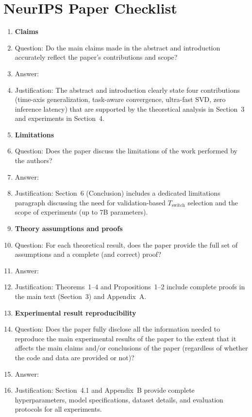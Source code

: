 \section*{NeurIPS Paper Checklist}

\begin{enumerate}

\item {\bf Claims}
    \item[] Question: Do the main claims made in the abstract and introduction accurately reflect the paper's contributions and scope?
    \item[] Answer: \answerYes{}
    \item[] Justification: The abstract and introduction clearly state four contributions (time-axis generalization, task-aware convergence, ultra-fast SVD, zero inference latency) that are supported by the theoretical analysis in Section~3 and experiments in Section~4.

\item {\bf Limitations}
    \item[] Question: Does the paper discuss the limitations of the work performed by the authors?
    \item[] Answer: \answerYes{}
    \item[] Justification: Section~6 (Conclusion) includes a dedicated limitations paragraph discussing the need for validation-based $T_{\mathrm{switch}}$ selection and the scope of experiments (up to 7B parameters).

\item {\bf Theory assumptions and proofs}
    \item[] Question: For each theoretical result, does the paper provide the full set of assumptions and a complete (and correct) proof?
    \item[] Answer: \answerYes{}
    \item[] Justification: Theorems~1--4 and Propositions~1--2 include complete proofs in the main text (Section~3) and Appendix~A.

    \item {\bf Experimental result reproducibility}
    \item[] Question: Does the paper fully disclose all the information needed to reproduce the main experimental results of the paper to the extent that it affects the main claims and/or conclusions of the paper (regardless of whether the code and data are provided or not)?
    \item[] Answer: \answerYes{}
    \item[] Justification: Section~4.1 and Appendix~B provide complete hyperparameters, model specifications, dataset details, and evaluation protocols for all experiments.



\end{enumerate}
